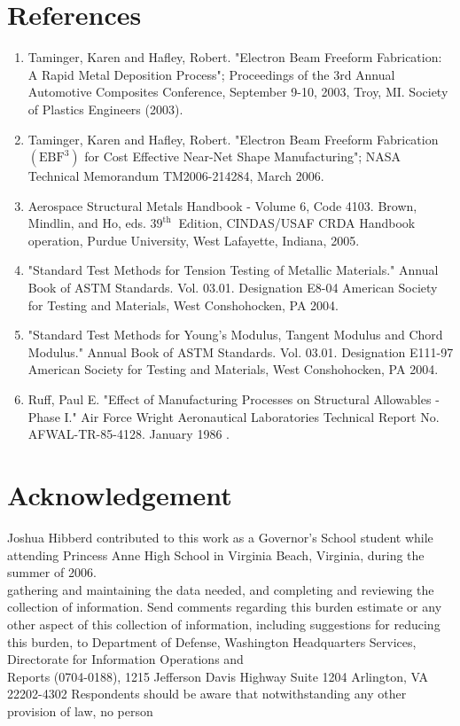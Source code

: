 \documentclass[10pt]{article}
\begin{document}
\section*{References}
\begin{enumerate}
  \item Taminger, Karen and Hafley, Robert. "Electron Beam Freeform Fabrication: A Rapid Metal Deposition Process"; Proceedings of the 3rd Annual Automotive Composites Conference, September 9-10, 2003, Troy, MI. Society of Plastics Engineers (2003).

  \item Taminger, Karen and Hafley, Robert. "Electron Beam Freeform Fabrication $\left(\mathrm{EBF}^{3}\right)$ for Cost Effective Near-Net Shape Manufacturing"; NASA Technical Memorandum TM2006-214284, March 2006.

  \item Aerospace Structural Metals Handbook - Volume 6, Code 4103. Brown, Mindlin, and Ho, eds. $39^{\text {th }}$ Edition, CINDAS/USAF CRDA Handbook operation, Purdue University, West Lafayette, Indiana, 2005.

  \item "Standard Test Methods for Tension Testing of Metallic Materials." Annual Book of ASTM Standards. Vol. 03.01. Designation E8-04 American Society for Testing and Materials, West Conshohocken, PA 2004.

  \item "Standard Test Methods for Young's Modulus, Tangent Modulus and Chord Modulus." Annual Book of ASTM Standards. Vol. 03.01. Designation E111-97 American Society for Testing and Materials, West Conshohocken, PA 2004.

  \item Ruff, Paul E. "Effect of Manufacturing Processes on Structural Allowables - Phase I." Air Force Wright Aeronautical Laboratories Technical Report No. AFWAL-TR-85-4128. January 1986 .

\end{enumerate}

\section*{Acknowledgement}
Joshua Hibberd contributed to this work as a Governor's School student while attending Princess Anne High School in Virginia Beach, Virginia, during the summer of 2006.\\
gathering and maintaining the data needed, and completing and reviewing the collection of information. Send comments regarding this burden estimate or any other aspect of this collection of information, including suggestions for reducing this burden, to Department of Defense, Washington Headquarters Services, Directorate for Information Operations and\\
Reports (0704-0188), 1215 Jefferson Davis Highway Suite 1204 Arlington, VA 22202-4302 Respondents should be aware that notwithstanding any other provision of law, no person
\end{document}

